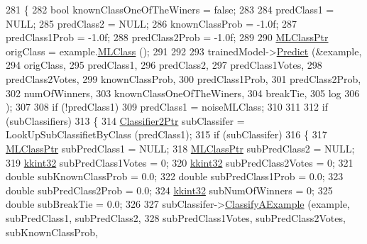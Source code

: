 \begin{DoxyCode}
281 \{
282   \textcolor{keywordtype}{bool}   knownClassOneOfTheWiners = \textcolor{keyword}{false};
283 
284   predClass1     = NULL;
285   predClass2     = NULL;
286   knownClassProb = -1.0f;
287   predClass1Prob = -1.0f;
288   predClass2Prob = -1.0f;
289 
290   \hyperlink{class_k_k_m_l_l_1_1_m_l_class}{MLClassPtr} origClass  = example.\hyperlink{class_k_k_m_l_l_1_1_feature_vector_a3c8fe002c6e868f8c00059c004fb32fd}{MLClass} ();
291 
292 
293   trainedModel->\hyperlink{class_k_k_m_l_l_1_1_model_a58ced625000ae9bffffb339e3c73d259}{Predict} (&example,
294                          origClass,
295                          predClass1,
296                          predClass2,
297                          predClass1Votes,
298                          predClass2Votes,
299                          knownClassProb,
300                          predClass1Prob,
301                          predClass2Prob,
302                          numOfWinners,
303                          knownClassOneOfTheWiners,
304                          breakTie,
305                          log
306                         );
307 
308   \textcolor{keywordflow}{if}  (!predClass1)
309     predClass1 = noiseMLClass;
310 
311 
312   \textcolor{keywordflow}{if}  (subClassifiers)
313   \{
314     \hyperlink{class_k_k_m_l_l_1_1_classifier2}{Classifier2Ptr}  subClassifer = LookUpSubClassifietByClass (predClass1);
315     \textcolor{keywordflow}{if}  (subClassifer)
316     \{
317       \hyperlink{class_k_k_m_l_l_1_1_m_l_class}{MLClassPtr}       subPredClass1      = NULL;
318       \hyperlink{class_k_k_m_l_l_1_1_m_l_class}{MLClassPtr}       subPredClass2      = NULL;
319       \hyperlink{namespace_k_k_b_a8fa4952cc84fda1de4bec1fbdd8d5b1b}{kkint32}          subPredClass1Votes = 0;
320       \hyperlink{namespace_k_k_b_a8fa4952cc84fda1de4bec1fbdd8d5b1b}{kkint32}          subPredClass2Votes = 0;
321       \textcolor{keywordtype}{double}           subKnownClassProb  = 0.0;
322       \textcolor{keywordtype}{double}           subPredClass1Prob  = 0.0;
323       \textcolor{keywordtype}{double}           subPredClass2Prob  = 0.0;
324       \hyperlink{namespace_k_k_b_a8fa4952cc84fda1de4bec1fbdd8d5b1b}{kkint32}          subNumOfWinners    = 0;
325       \textcolor{keywordtype}{double}           subBreakTie        = 0.0;
326 
327       subClassifer->\hyperlink{class_k_k_m_l_l_1_1_classifier2_a071ddf2533fbd732558aa8bcfd9f1878}{ClassifyAExample} (example, subPredClass1, subPredClass2, 
328                                     subPredClass1Votes, subPredClass2Votes, subKnownClassProb,

\end{DoxyCode}
